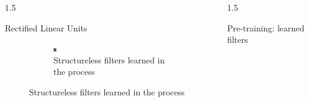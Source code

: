 \documentclass[final]{beamer}
\newlength{\onecolwid}
\newlength{\threecolwid}
\begin{document}
\begin{frame}[t]
\begin{columns}[t]
\begin{column}{\threecolwid}
\begin{columns}[t, totalwidth=\threecolwid]
\begin{column}{1.5\onecolwid}
\begin{block}{Rectified Linear Units}
\begin{figure}
\begin{subfigure}{0.4\linewidth}
			\includegraphics[width=0.1\linewidth]{graphics/reconstructions/cifar/relu/relu_filter_08.png} 

			\caption{Structureless filters learned in the process}

		\end{subfigure}

		

	\end{figure}

\end{block}

\end{column}

\begin{column}{1.5\onecolwid}

	\begin{block}{Pre-training: learned filters}

		\begin{figure}
		\centering


\end{figure}
\end{block}
\end{column}
\end{columns}
\end{column}
\end{columns}
\end{frame}
\end{document}
